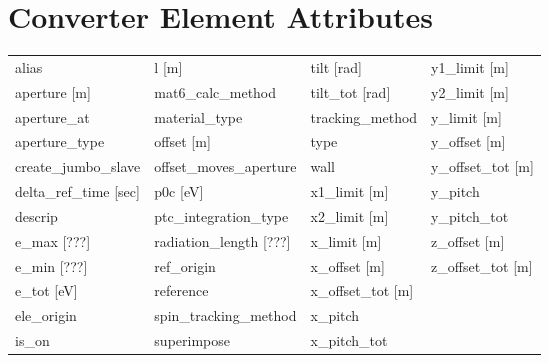  \section{Converter Element Attributes}
 \label{s:list.converter}
 
 \begin{tabular}{llll} \toprule
alias                          & l [m]                          & tilt [rad]                     & y1_limit [m]                   \\
aperture [m]                   & mat6_calc_method               & tilt_tot [rad]                 & y2_limit [m]                   \\
aperture_at                    & material_type                  & tracking_method                & y_limit [m]                    \\
aperture_type                  & offset [m]                     & type                           & y_offset [m]                   \\
create_jumbo_slave             & offset_moves_aperture          & wall                           & y_offset_tot [m]               \\
delta_ref_time [sec]           & p0c [eV]                       & x1_limit [m]                   & y_pitch                        \\
descrip                        & ptc_integration_type           & x2_limit [m]                   & y_pitch_tot                    \\
e_max [???]                    & radiation_length [???]         & x_limit [m]                    & z_offset [m]                   \\
e_min [???]                    & ref_origin                     & x_offset [m]                   & z_offset_tot [m]               \\
e_tot [eV]                     & reference                      & x_offset_tot [m]               &                                \\
ele_origin                     & spin_tracking_method           & x_pitch                        &                                \\
is_on                          & superimpose                    & x_pitch_tot                    &                                \\
 \bottomrule
 \end{tabular}
 \vfill
 
